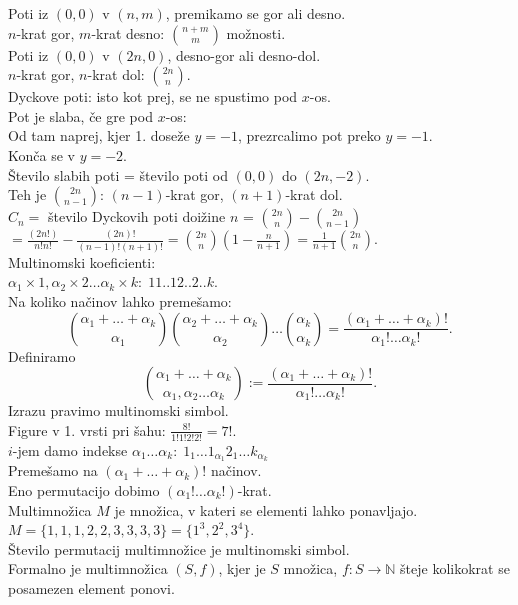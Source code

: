 \documentclass[a4paper, 12pt]{book}
\theoremstyle{definition}
\theoremstyle{remark}
\newcommand{\N}{\mathbb{N}}
\begin{document}
Poti iz $(0,0)$ v $(n,m)$, premikamo se gor ali desno. \\
$n$-krat gor, $m$-krat desno: $\binom{n+m}{m}$ možnosti. \\
Poti iz $(0,0)$ v $(2n,0)$, desno-gor ali desno-dol. \\
$n$-krat gor, $n$-krat dol: $\binom{2n}{n}$. \\
Dyckove poti: isto kot prej, se ne spustimo pod $x$-os. \\
Pot je slaba, če gre pod $x$-os: \\
Od tam naprej, kjer 1. doseže $y=-1$, prezrcalimo pot preko $y=-1$. \\
Konča se v $y=-2$. \\
Število slabih poti = število poti od $(0,0)$ do $(2n,-2)$. \\
Teh je $\binom{2n}{n-1}$: $(n-1)$-krat gor, $(n+1)$-krat dol. \\
$C_n =$ število Dyckovih poti doižine $n$ = $\binom{2n}{n} - \binom{2n}{n-1}$ \\
$= \frac{(2n!)}{n!n!} - \frac{(2n)!}{(n-1)!(n+1)!} = \binom{2n}{n}(1 - \frac{n}{n+1}) = \frac{1}{n+1} \binom{2n}{n}$. \\
Multinomski koeficienti: \\
$\alpha_1 \times 1, \alpha_2 \times 2 \dots \alpha_k \times k: \; 11..12..2..k$. \\
Na koliko načinov lahko premešamo:
\begin{equation*}
  \binom{\alpha_1 + \dots + \alpha_k}{\alpha_1} \binom{\alpha_2 + \dots + \alpha_k}{\alpha_2} \dots
  \binom{\alpha_k}{\alpha_k} =
  \frac{(\alpha_1 + \dots + \alpha_k)!}{\alpha_1! \dots \alpha_k!}.
\end{equation*}
Definiramo
\begin{equation}
  \label{multinomski}
  \binom{\alpha_1 + \dots + \alpha_k}{\alpha_1, \alpha_2 \dots \alpha_k} := \frac{(\alpha_1 + \dots + \alpha_k)!}{\alpha_1! \dots \alpha_k!}.
\end{equation}
Izrazu  pravimo multinomski simbol. \\
Figure v 1. vrsti pri šahu: $\frac{8!}{1!1!2!2!} = 7!$. \\
$i$-jem damo indekse $\alpha_1 \dots \alpha_k: \; 1_1 \dots 1_{\alpha_1} 2_1 \dots k_{\alpha_k}$ \\
Premešamo na $(\alpha_1 + \dots + \alpha_k)!$ načinov. \\
Eno permutacijo dobimo $(\alpha_1! \dots \alpha_k!)$-krat. \\
Multimnožica $M$ je množica, v kateri se elementi lahko ponavljajo. \\
$M = \{1, 1, 1, 2, 2, 3, 3, 3, 3\} = \{1^3, 2^2, 3^4\}$. \\
Število permutacij multimnožice je multinomski simbol. \\
Formalno je multimnožica $(S,f)$, kjer je $S$ množica, $f: S \to \N$ šteje kolikokrat se posamezen element ponovi.
\end{document}
